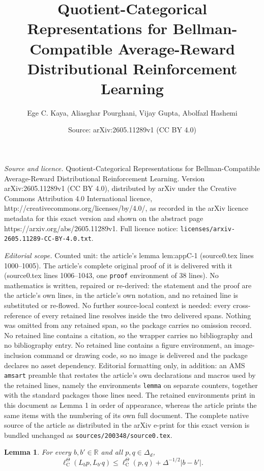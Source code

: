 \documentclass[10pt,a4paper]{amsart}
\title{Quotient-Categorical Representations for Bellman-Compatible Average-Reward Distributional Reinforcement Learning}
\author{Ege C. Kaya, Aliasghar Pourghani, Vijay Gupta, Abolfazl Hashemi}
\date{Source: arXiv:2605.11289v1 (CC BY 4.0)}
\newtheorem{lemma}{Lemma}
\newcommand{\R}{\mathbb{R}}
\begin{document}
\maketitle

\noindent\emph{Source and licence.} Quotient-Categorical Representations for Bellman-Compatible Average-Reward Distributional Reinforcement Learning. Version arXiv:2605.11289v1 (CC BY 4.0), distributed by arXiv under the Creative Commons Attribution 4.0 International licence, http://creativecommons.org/licenses/by/4.0/, as recorded in the arXiv licence metadata for this exact version and shown on the abstract page https://arxiv.org/abs/2605.11289v1. Full licence notice: \texttt{licenses/arxiv-2605.11289-CC-BY-4.0.txt}.\par\smallskip

\noindent\textit{Editorial scope.} Counted unit: the article's lemma lem:appC-1 (source0.tex lines 1000--1005). The article's complete original proof of it is delivered with it (source0.tex lines 1006--1043, one \texttt{proof} environment of 38 lines). No mathematics is written, repaired or re-derived: the statement and the proof are the article's own lines, in the article's own notation, and no retained line is substituted or re-flowed.  No further source-local context is needed: every cross-reference of every retained line resolves inside the two delivered spans.  Nothing was omitted from any retained span, so the package carries no omission record.  No retained line contains a citation, so the wrapper carries no bibliography and no bibliography entry.  No retained line contains a figure environment, an image-inclusion command or drawing code, so no image is delivered and the package declares no asset dependency.  Editorial formatting only, in addition: an AMS \texttt{amsart} preamble that restates the article's own declarations and macros used by the retained lines, namely the environments \texttt{lemma} on separate counters, together with the standard packages those lines need.  The retained environments print in this document as Lemma 1 in order of appearance, whereas the article prints the same items with the numbering of its own full document.  The complete native source of the article as distributed in the arXiv e-print for this exact version is bundled unchanged as \texttt{sources/200348/source0.tex}.
\begin{lemma}\label{lem:appC-1}
For every $b, b' \in \R$ and all $p, q \in \Delta_d$,
\begin{equation}
\ell^\Theta_\mathrm C(L_b p, L_{b'}q) \le \ell^\Theta_\mathrm C(p, q) + \Delta^{-1/2}\lvert b - b'\rvert.
\end{equation}
\end{lemma}
\end{document}
